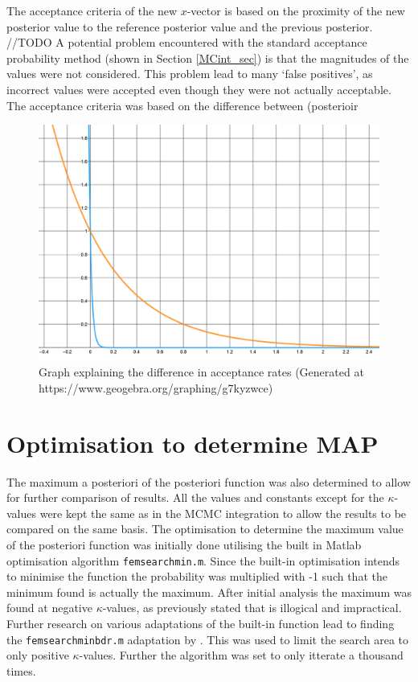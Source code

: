 %	
	
	The acceptance criteria of the new $x$-vector is based on the proximity of the new posterior value to the reference posterior value and the previous posterior. //TODO
	A potential problem encountered with the standard acceptance probability method (shown in Section \ref{MCint_sec}) is that the magnitudes of the values were not considered. 
	This problem lead to many `false positives', as incorrect values were accepted even though they were not actually acceptable. 
	The acceptance criteria was based on the difference between (posterioir
	
	\begin{figure}[H]
	\centering
	\includegraphics[width = 0.5\linewidth]{figures/e_expl_curve.png}
	\caption{Graph explaining the difference in acceptance rates (Generated at https://www.geogebra.org/graphing/g7kyzwce)}
	\end{figure}
	 
	
	
	\section{Optimisation to determine MAP}
The maximum a posteriori of the posteriori function was also determined to allow for further comparison of results.
All the values and constants except for the $\kappa$-values were kept the same as in the MCMC integration to allow the results to be compared on the same basis.  
	The optimisation to determine the maximum value of the posteriori function was initially done utilising the built in Matlab optimisation algorithm \texttt{femsearchmin.m}. 
	Since the built-in optimisation intends to minimise the function the probability was multiplied with -1 such that the minimum found is actually the maximum.
	After initial analysis the maximum was found at negative $\kappa$-values, as previously stated that is illogical and impractical.
	Further research on various adaptations of the built-in function lead to finding the \texttt{femsearchminbdr.m} adaptation by \citet{derrico:2021}. 
	This was used to limit the search area to only positive $\kappa$-values.
	Further the algorithm was set to only itterate a thousand times. 
	
	
